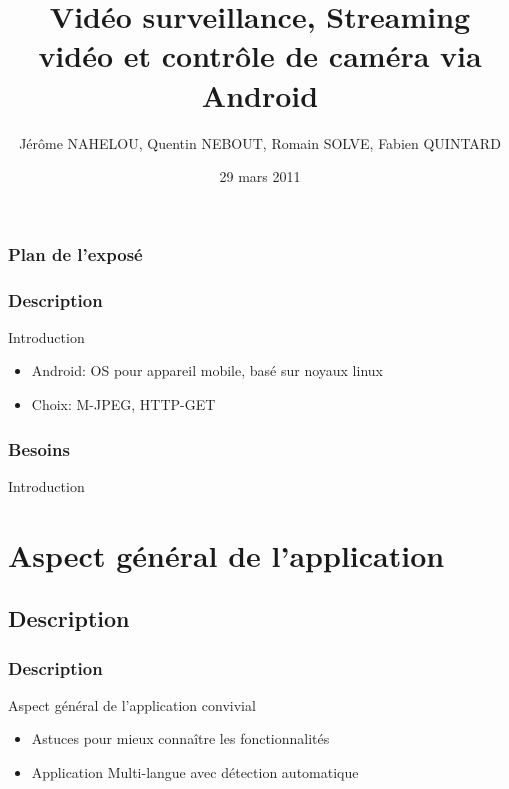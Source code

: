 \documentclass{beamer}
\title{Vidéo surveillance, Streaming vidéo et contrôle de caméra via Android }
\author{\tiny{Jérôme NAHELOU, Quentin NEBOUT, Romain SOLVE, Fabien QUINTARD}}
\institute{\large{Chargé de Projet : Yérom-David Bromberg}\\ \bigskip{}

\small{Université Bordeaux 1}}
\date{29 mars 2011}
\begin{document}
\frame[plain]{\titlepage}


\begin{frame}
\frametitle{Plan de l'exposé}
\small{\tableofcontents[hideallsubsections]}
\end{frame}


  \begin{frame}
   \frametitle{Description}
  Introduction
   \begin{itemize}
    \item Android: OS pour appareil mobile, basé sur noyaux linux
    \item Choix: M-JPEG, HTTP-GET
   \end{itemize}
  \end{frame}
  
  \begin{frame}
   \frametitle{Besoins}
  Introduction
  \end{frame}

\section{Aspect général de l'application}
  \subsection{Description}
  \begin{frame}
   \frametitle{Description}
  Aspect général de l'application convivial
   \begin{itemize}
    \item Astuces pour mieux connaître les fonctionnalités
    \item Application Multi-langue avec détection automatique
   \end{itemize}
  \end{frame}

\end{document}
